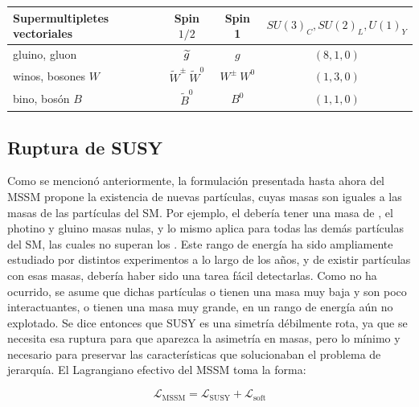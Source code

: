 \begin{table}[!ht]
	\begin{tabular}{ l c | c c c}

		\hline
		\hline

		\multicolumn{2}{l|}{Supermultipletes vectoriales} & Spin $1/2$ & Spin 1 & $SU(3)_C, SU(2)_L, U(1)_Y$ \\

		\hline
		\hline

		\multicolumn{2}{l|}{gluino, gluon} & $\widetilde{g}$ & $g$ & $(8, 1, 0)$ \\ [1ex]
		\multicolumn{2}{l|}{winos, bosones $W$} & $\widetilde{W}^{\pm}\ \widetilde{W}^{0}$ & $W^{\pm}\ W^0$ & $(1, 3, 0)$ \\ [1ex]
		\multicolumn{2}{l|}{bino, bosón $B$} & $\widetilde{B}^0$ & $B^0$ & $(1, 1, 0)$ \\ [1ex]

		\hline
		\hline

	\end{tabular}
	\renewcommand{\arraystretch}{1}

	\label{tab:mssm_particles}

\end{table}


\subsection{Ruptura de SUSY}

Como se mencionó anteriormente, la formulación presentada hasta ahora del MSSM propone la existencia de nuevas partículas, cuyas masas son iguales a las masas de las partículas del SM. Por ejemplo, el \selL debería tener una masa de , el photino y gluino masas nulas, y lo mismo aplica para todas las demás partículas del SM, las cuales no superan los . Este rango de energía ha sido ampliamente estudiado por distintos experimentos a lo largo de los años, y de existir partículas con esas masas, debería haber sido una tarea fácil detectarlas. Como no ha ocurrido, se asume que dichas partículas o tienen una masa muy baja y son poco interactuantes, o tienen una masa muy grande, en un rango de energía aún no explotado. Se dice entonces que SUSY es una simetría débilmente rota, ya que se necesita esa ruptura para que aparezca la asimetría en masas, pero lo mínimo y necesario para preservar las características que solucionaban el problema de jerarquía. El Lagrangiano efectivo del MSSM toma la forma:

\begin{equation}
	\mathcal{L}_{\text{MSSM}} = \mathcal{L}_{\text{SUSY}} + \mathcal{L}_{\text{soft}} 
	\label{eq:l_susy}
\end{equation}

